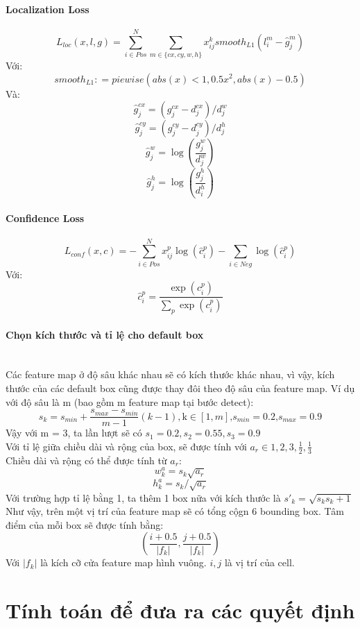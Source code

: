 \documentclass[a4paper,10pt]{article}
\begin{document}
\paragraph{Localization Loss}
\mbox{}\[L_{loc}\left( x,l,g \right) = \sum^N_{i\in Pos} \sum_{m\in\{cx,cy,w,h\}} x_{ij}^k smooth_{L1}\left( l_i^m - \hat{g}^m_j\right)\]
Với:
\[smooth_{L1} \colon= piewise( abs( x ) < 1, 0.5x^2, abs( x ) - 0.5)\]
Và:
\[\hat{g}_j^{cx} = \left( g_j^{cx} - d_j^{cx} \right)/ d_j^w\]
\[\hat{g}_j^{cy} = \left( g_j^{cy} - d_j^{cy} \right) / d_j^h\]
\[\hat{g}_j^w = \log\left( \frac{g_j^w}{d_j^w} \right)\]
\[\hat{g}_j^h = \log\left( \frac{g_j^h}{d^h_i} \right)\]
\paragraph{Confidence Loss}
\mbox{}\[L_{conf} \left( x,c \right) = - \sum_{i \in Pos}^N x_{ij}^p \log \left( \hat{c}_i^p \right) - \sum_{i \in N eg} \log\left( \hat{c}_i^p \right)\]
Với:
\[\hat{c}_i^p = \frac{\exp\left( c_i^p \right)}{\sum_p \exp\left( c_i^p \right)}\]
\paragraph{Chọn kích thước và tỉ lệ cho default box}
\mbox{}\\Các feature map ở độ sâu khác nhau sẽ có kích thước khác nhau, vì vậy, kích thước của các default box cũng được thay đôi theo độ sâu của feature map. Ví dụ với độ sâu là m (bao gồm m feature map tại bước detect):\[s_k = s_{min} + \frac{s_{max} - s_{min}}{m - 1} \left( k - 1 \right), \text{k} \in \left[1,m \right] \text{,} s_{min}=0.2 \text{,} s_{max}=0.9\]
Vậy với m = 3, ta lần lượt sẽ có \(s_1 = 0.2, s_2 = 0.55, s_3 = 0.9\)
\\Với tỉ lệ giữa chiều dài và rộng của box, sẽ được tính với \(a_r \in { 1, 2, 3, \frac{1}{2}, \frac{1}{3}}\)
\\Chiều dài và rộng có thể được tính từ \(a_r\):
\[w_k^a = s_k \sqrt{a_r}\]
\[h_k^a = s_k / \sqrt{a_r}\]
Với trường hợp tỉ lệ bằng 1, ta thêm 1 box nữa với kích thước là \({s\prime}_k = \sqrt{s_ks_k+1}\) Như vậy, trên một vị trí của feature map sẽ có tổng cộgn 6 bounding box. Tâm điểm của mỗi box sẽ được tính bằng:
\[\left( \frac{i+0.5}{\vert f_k \vert}, \frac{j+0.5}{\vert f_k \vert} \right)\]
Với \(\vert f_k \vert\) là kích cỡ cửa feature map hình vuông. \(i , j\) là vị trí của cell.

\section{Tính toán để đưa ra các quyết định}
\end{document}
